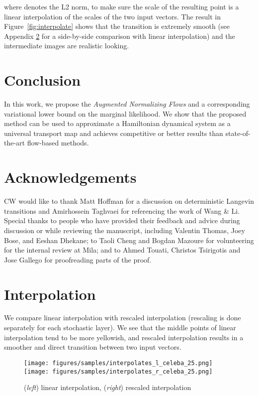 \documentclass{article}
\begin{document}
where  denotes the L2 norm, to make sure the scale of the resulting point is a linear interpolation of the scales of the two input vectors.
The result in Figure~\ref{fig:interpolate} shows that the transition is extremely smooth (see Appendix \ref{app:inter} for a side-by-side comparison with linear interpolation) and the intermediate images are realistic looking. 




\section{Conclusion}
In this work, we propose the \emph{Augmented Normalizing Flows} and a corresponding variational lower bound on the marginal likelihood.
We show that the proposed method can be used to approximate a Hamiltonian dynamical system as a universal transport map and achieves competitive or better results than state-of-the-art flow-based methods. 


\iftrue
\section*{Acknowledgements}{
CW would like to thank 
Matt Hoffman for a discussion on deterministic Langevin transitions and Amirhossein Taghvaei for referencing the work of Wang \& Li. 
Special thanks to people who have provided their feedback and advice during discussion or while reviewing the manuscript, including Valentin Thomas, Joey Bose, and Eeshan Dhekane; to
Taoli Cheng and Bogdan Mazoure for volunteering for the internal review at Mila; and to Ahmed Touati, Christos Tsirigotis and Jose Gallego for proofreading parts of the proof. 
}
\fi






\clearpage
\appendix
\onecolumn

\section{Interpolation}
\label{app:inter}
We compare linear interpolation with rescaled interpolation (rescaling is done separately for each stochastic layer). 
We see that the middle points of linear interpolation tend to be more yellowish, and rescaled interpolation results in a smoother and direct transition between two input vectors.
\begin{figure*}[h!]
    \centering
    \texttt{[image: figures/samples/interpolates\_l\_celeba\_25.png]}
    \hfill
    \texttt{[image: figures/samples/interpolates\_r\_celeba\_25.png]}
    \caption{(\emph{left}) linear interpolation, (\emph{right}) rescaled interpolation}
    \label{fig:interpolate_compare}
\end{figure*}
\end{document}
